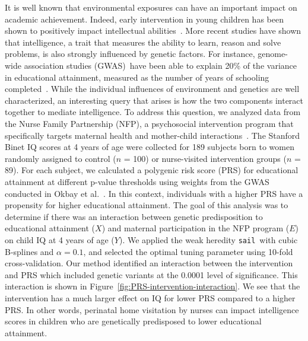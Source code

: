 \documentclass[12pt,letter]{article}\usepackage[]{graphicx}\usepackage[]{color}
\newcommand{\sail}{\texttt{sail}}
\begin{document}
It is well known that environmental exposures can have an important impact on academic achievement.
Indeed, early intervention in young children has been shown to positively impact intellectual abilities~\citep{campbell1994effects}. 
More recent studies have shown that intelligence, a trait that measures the ability to learn, reason and solve problems, is also strongly influenced by genetic factors. 
For instance, genome-wide association studies (GWAS) have been able to explain 20\% of the variance in educational attainment, measured as the number of years of schooling completed~\citep{okbay2016genome}. 
While the individual influences of environment and genetics are well characterized, an interesting query that arises is how the two components interact together to mediate intelligence. 
To address this question, we analyzed data from the Nurse Family Partnership (NFP), a psychosocial intervention program that specifically targets maternal health and mother-child interactions~\citep{olds1998long}. 
The Stanford Binet IQ scores at 4 years of age were collected for 189 subjects born to women randomly assigned to control ($n$ = 100) or nurse-visited intervention groups ($n$ = 89). 
For each subject, we calculated a polygenic risk score (PRS) for educational attainment at different p-value thresholds using weights from the GWAS conducted in Okbay et al.~\citep{okbay2016genome}. 
In this context, individuals with a higher PRS have a propensity for higher educational attainment.  
The goal of this analysis was to determine if there was an interaction between genetic predisposition to educational attainment ($X$) and maternal participation in the NFP program ($E$) on child IQ at 4 years of age ($Y$). 
We applied the weak heredity \sail ~with cubic B-splines and $\alpha=0.1$, and selected the optimal tuning parameter using 10-fold cross-validation. 
Our method identified an interaction between the intervention and PRS which included genetic variants at the 0.0001 level of significance. 
This interaction is shown in Figure~\ref{fig:PRS-intervention-interaction}. 
We see that the intervention has a much larger effect on IQ for lower PRS compared to a higher PRS. 
In other words, perinatal home visitation by nurses can impact intelligence scores in children who are genetically predisposed to lower educational attainment. 
\end{document}
